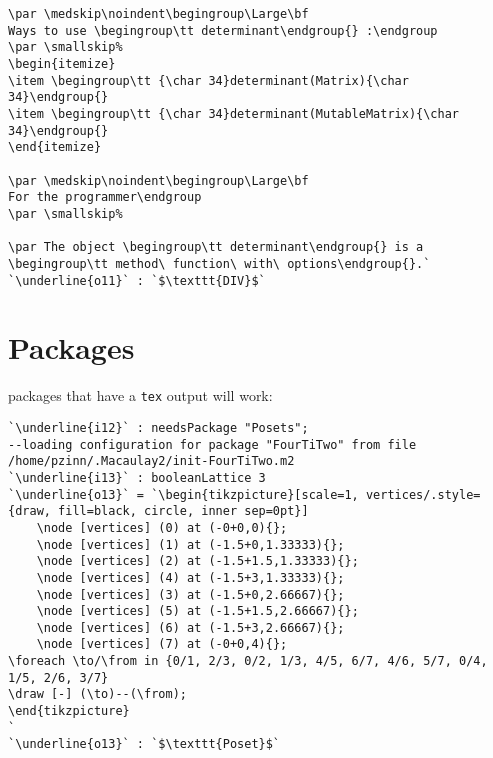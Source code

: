 \documentclass[12pt,a4paper]{amsart}
\begin{document}
\begin{lstlisting}[language=Macaulay2]
\par \medskip\noindent\begingroup\Large\bf
Ways to use \begingroup\tt determinant\endgroup{} :\endgroup
\par \smallskip%
\begin{itemize}
\item \begingroup\tt {\char 34}determinant(Matrix){\char 34}\endgroup{}
\item \begingroup\tt {\char 34}determinant(MutableMatrix){\char 34}\endgroup{}
\end{itemize}

\par \medskip\noindent\begingroup\Large\bf
For the programmer\endgroup
\par \smallskip%

\par The object \begingroup\tt determinant\endgroup{} is a \begingroup\tt method\ function\ with\ options\endgroup{}.`
`\underline{o11}` : `$\texttt{DIV}$`\end{lstlisting}

\section{Packages}
packages that have a {\tt tex} output will work:
\begin{lstlisting}[language=Macaulay2]
`\underline{i12}` : needsPackage "Posets";
--loading configuration for package "FourTiTwo" from file /home/pzinn/.Macaulay2/init-FourTiTwo.m2
`\underline{i13}` : booleanLattice 3
`\underline{o13}` = `\begin{tikzpicture}[scale=1, vertices/.style={draw, fill=black, circle, inner sep=0pt}]
	\node [vertices] (0) at (-0+0,0){};
	\node [vertices] (1) at (-1.5+0,1.33333){};
	\node [vertices] (2) at (-1.5+1.5,1.33333){};
	\node [vertices] (4) at (-1.5+3,1.33333){};
	\node [vertices] (3) at (-1.5+0,2.66667){};
	\node [vertices] (5) at (-1.5+1.5,2.66667){};
	\node [vertices] (6) at (-1.5+3,2.66667){};
	\node [vertices] (7) at (-0+0,4){};
\foreach \to/\from in {0/1, 2/3, 0/2, 1/3, 4/5, 6/7, 4/6, 5/7, 0/4, 1/5, 2/6, 3/7}
\draw [-] (\to)--(\from);
\end{tikzpicture}
`
`\underline{o13}` : `$\texttt{Poset}$`\end{lstlisting}
\end{document}
